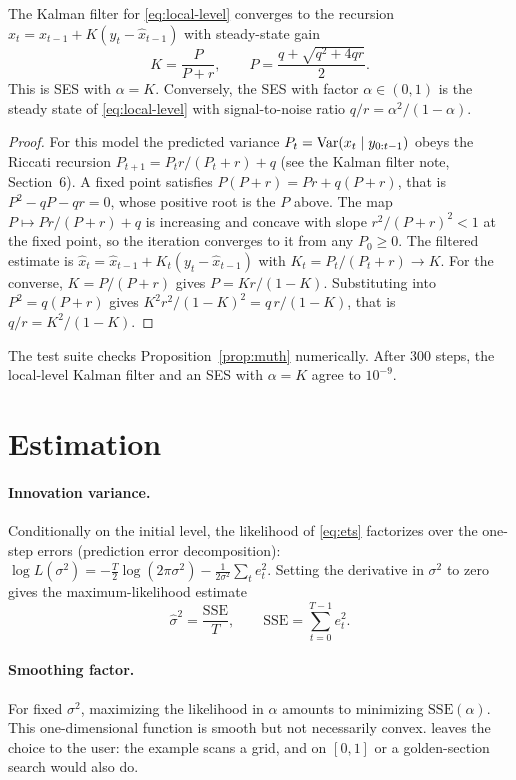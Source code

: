\documentclass[11pt,a4paper]{article}
\begin{document}
\begin{proposition}\label{prop:muth}
The Kalman filter for \eqref{eq:local-level} converges to the recursion
$\hat x_t = \hat x_{t-1} + K(y_t-\hat x_{t-1})$ with steady-state gain
\[
  K = \frac{P}{P+r},\qquad P = \frac{q+\sqrt{q^2+4qr}}{2}.
\]
This is SES with $\alpha=K$. Conversely, the SES with factor $\alpha\in(0,1)$ is the steady state of
\eqref{eq:local-level} with signal-to-noise ratio $q/r = \alpha^2/(1-\alpha)$.
\end{proposition}
\begin{proof}
For this model the predicted variance $P_t=\operatorname{Var}(x_t\mid y_{0:t-1})$ obeys the
Riccati recursion $P_{t+1} = P_t r/(P_t+r) + q$ (see the Kalman filter note,
Section~6). A fixed point satisfies $P(P+r)=Pr+q(P+r)$, that is
$P^2-qP-qr=0$, whose positive root is the $P$ above. The map
$P\mapsto Pr/(P+r)+q$ is increasing and concave with slope $r^2/(P+r)^2<1$ at the
fixed point, so the iteration converges to it from any $P_0\ge0$. The filtered
estimate is $\hat x_t = \hat x_{t-1} + K_t(y_t-\hat x_{t-1})$ with
$K_t=P_t/(P_t+r)\to K$. For the converse, $K=P/(P+r)$ gives $P=Kr/(1-K)$.
Substituting into $P^2=q(P+r)$ gives $K^2r^2/(1-K)^2 = q\,r/(1-K)$, that is $q/r=K^2/(1-K)$.
\end{proof}

The  test suite checks Proposition~\ref{prop:muth} numerically. After
300 steps, the local-level Kalman filter and an SES with $\alpha=K$ agree to
$10^{-9}$.

\section{Estimation}

\paragraph{Innovation variance.}
Conditionally on the initial level, the likelihood of \eqref{eq:ets} factorizes
over the one-step errors (prediction error decomposition):
$\log L(\sigma^2) = -\frac{T}{2}\log(2\pi\sigma^2) - \frac{1}{2\sigma^2}\sum_t e_t^2$.
Setting the derivative in $\sigma^2$ to zero gives the maximum-likelihood
estimate
\[
  \hat\sigma^2 = \frac{\mathrm{SSE}}{T},\qquad \mathrm{SSE}=\sum_{t=0}^{T-1} e_t^2 .
\]

\paragraph{Smoothing factor.}
For fixed $\sigma^2$, maximizing the likelihood in $\alpha$ amounts to minimizing
$\mathrm{SSE}(\alpha)$. This one-dimensional function is smooth but not
necessarily convex.  leaves the choice to the user: the
 example scans a grid, and  on $[0,1]$
or a golden-section search would also do.
\end{document}
